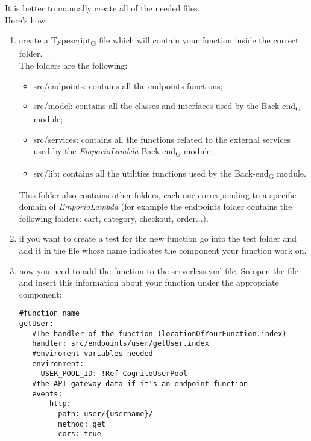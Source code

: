 It is better to manually create all of the needed files.\\
Here's how:
\begin{enumerate}
\item create a Typescript\textsubscript{G} file which will contain your function inside the correct folder.\\The folders are the following:
\begin{itemize}
\item src/endpoints: contains all the endpoints functions;
\item src/model: contains all the classes and interfaces used by the Back-end\textsubscript{G} module;
\item src/services: contains all the functions related to the external services used by the \textit{EmporioLambda} Back-end\textsubscript{G} module;
\item src/lib: contains all the utilities functions used by the Back-end\textsubscript{G} module.
\end{itemize}
This folder also contains other folders, each one corresponding to a specific domain of \textit{EmporioLambda} (for example the endpoints folder contains the following folders: cart, category, checkout, order...). 
\item if you want to create a test for the new function go into the test folder and add it in the file whose name indicates the component your function work on.
\item now you need to add the function to the serverless.yml file. So open the file and insert this information about your function under the appropriate component:
\begin{lstlisting}
#function name
getUser:
   #The handler of the function (locationOfYourFunction.index)
   handler: src/endpoints/user/getUser.index
   #enviroment variables needed
   environment:
     USER_POOL_ID: !Ref CognitoUserPool
   #the API gateway data if it's an endpoint function
   events:
     - http:
         path: user/{username}/
         method: get
         cors: true
\end{lstlisting}
\end{enumerate}